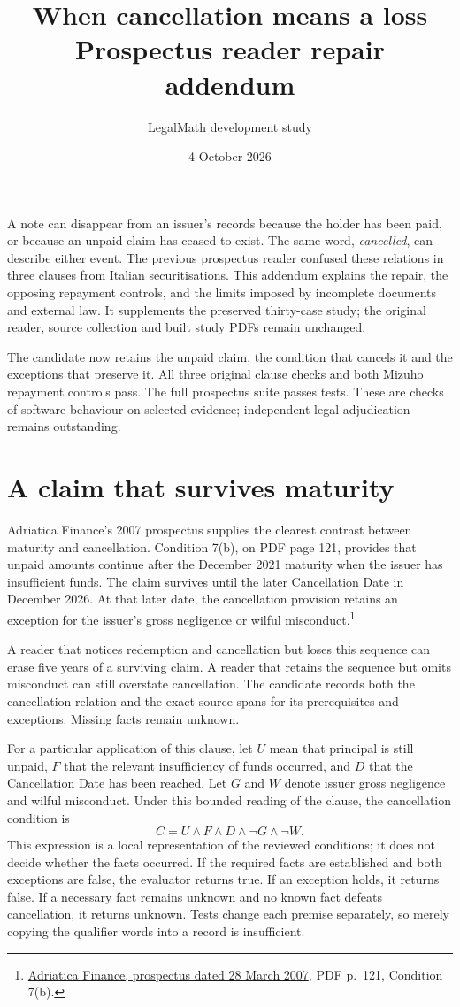 \documentclass[11pt,a4paper]{article}
\title{When cancellation means a loss\\Prospectus reader repair addendum}
\author{LegalMath development study}
\date{4 October 2026}
\begin{document}
\maketitle

A note can disappear from an issuer's records because the holder has been paid,
or because an unpaid claim has ceased to exist. The same word, \emph{cancelled},
can describe either event. The previous prospectus reader confused these
relations in three clauses from Italian securitisations. This addendum explains
the repair, the opposing repayment controls, and the limits imposed by incomplete
documents and external law. It supplements the preserved thirty-case study; the
original reader, source collection and built study PDFs remain unchanged.

The candidate now retains the unpaid claim, the condition that cancels it and
the exceptions that preserve it. All three original clause checks and both
Mizuho repayment controls pass. The full prospectus suite passes
\AllTests{} tests. These are checks of software behaviour on selected evidence;
independent legal adjudication remains outstanding.

\section*{A claim that survives maturity}

Adriatica Finance's 2007 prospectus supplies the clearest contrast between
maturity and cancellation. Condition 7(b), on PDF page 121, provides that unpaid
amounts continue after the December 2021 maturity when the issuer has insufficient
funds. The claim survives until the later Cancellation Date in December 2026.
At that later date, the cancellation provision retains an exception for the
issuer's gross negligence or wilful misconduct.\footnote{\href{../../prospectus/corner-cases-2026-10-04/sources/jur-more-hypo-843665/source.pdf}{Adriatica Finance, prospectus dated 28 March 2007}, PDF p.~121, Condition 7(b).}

A reader that notices redemption and cancellation but loses this sequence
can erase five years of a surviving claim. A reader that retains the sequence
but omits misconduct can still overstate cancellation. The candidate records
both the cancellation relation and the exact source spans for its prerequisites
and exceptions. Missing facts remain unknown.

For a particular application of this clause, let \(U\) mean that principal is
still unpaid, \(F\) that the relevant insufficiency of funds occurred, and \(D\)
that the Cancellation Date has been reached. Let \(G\) and \(W\) denote issuer
gross negligence and wilful misconduct. Under this bounded reading of the
clause, the cancellation condition is
\[
 C=U\land F\land D\land\neg G\land\neg W.
\]
This expression is a local representation of the reviewed conditions; it does
not decide whether the facts occurred. If the required facts are established
and both exceptions are false, the evaluator returns true. If an exception
holds, it returns false. If a necessary fact remains unknown and no known fact
defeats cancellation, it returns unknown. Tests change each premise separately,
so merely copying the qualifier words into a record is insufficient.
\end{document}
